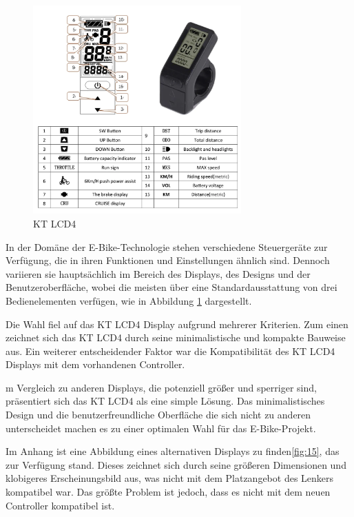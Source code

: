 \begin{figure}[h]
    \centering
    \includegraphics[width=8cm]{images/Elektrische-Bike-Display-KT-LCD4.png}
    \caption{KT LCD4\cite{noauthor_2822_nodate}}%
    \label{fig:14}
\end{figure}

In der Domäne der E-Bike-Technologie stehen verschiedene Steuergeräte zur Verfügung, die in ihren Funktionen und Einstellungen ähnlich sind. Dennoch variieren sie hauptsächlich im Bereich des Displays, des Designs und der Benutzeroberfläche, wobei die meisten über eine Standardausstattung von drei Bedienelementen verfügen, wie in Abbildung \ref{fig:14} dargestellt.

Die Wahl fiel auf das KT LCD4 Display aufgrund mehrerer Kriterien. Zum einen zeichnet sich das KT LCD4 durch seine minimalistische und kompakte Bauweise aus. Ein weiterer entscheidender Faktor war die Kompatibilität des KT LCD4 Displays mit dem vorhandenen Controller.

m Vergleich zu anderen Displays, die potenziell größer und sperriger sind, präsentiert sich das KT LCD4 als eine simple Lösung. Das minimalistisches Design und die benutzerfreundliche Oberfläche die sich nicht zu anderen unterscheidet machen es zu einer optimalen Wahl für das E-Bike-Projekt.

Im Anhang ist eine Abbildung eines alternativen Displays zu finden\ref{fig:15}, das zur Verfügung stand. Dieses zeichnet sich durch seine größeren Dimensionen und klobigeres Erscheinungsbild aus, was nicht mit dem Platzangebot des Lenkers kompatibel war. Das größte Problem ist jedoch, dass es nicht mit dem neuen Controller kompatibel ist.




